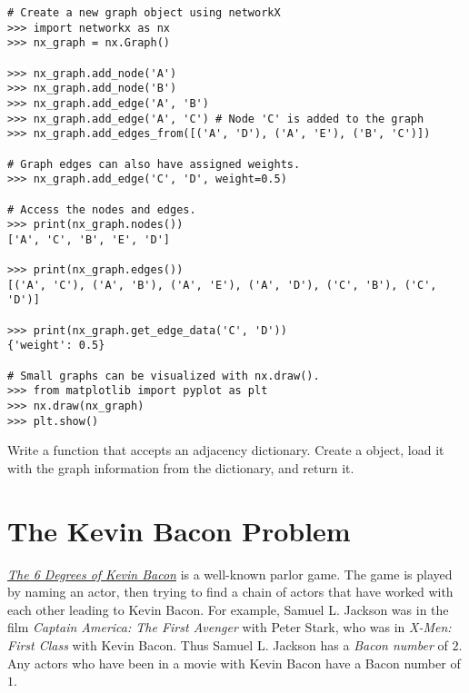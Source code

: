 \begin{lstlisting}
# Create a new graph object using networkX
>>> import networkx as nx
>>> nx_graph = nx.Graph()

>>> nx_graph.add_node('A')
>>> nx_graph.add_node('B')
>>> nx_graph.add_edge('A', 'B')
>>> nx_graph.add_edge('A', 'C') # Node 'C' is added to the graph
>>> nx_graph.add_edges_from([('A', 'D'), ('A', 'E'), ('B', 'C')])

# Graph edges can also have assigned weights.
>>> nx_graph.add_edge('C', 'D', weight=0.5)

# Access the nodes and edges.
>>> print(nx_graph.nodes())
['A', 'C', 'B', 'E', 'D']

>>> print(nx_graph.edges())
[('A', 'C'), ('A', 'B'), ('A', 'E'), ('A', 'D'), ('C', 'B'), ('C', 'D')]

>>> print(nx_graph.get_edge_data('C', 'D'))
{'weight': 0.5}

# Small graphs can be visualized with nx.draw().
>>> from matplotlib import pyplot as plt
>>> nx.draw(nx_graph)
>>> plt.show()
\end{lstlisting}

\begin{problem}
Write a function that accepts an adjacency dictionary.
Create a  object, load it with the graph information from the dictionary, and return it.
\end{problem}

\section*{The Kevin Bacon Problem}

\href{http://oracleofbacon.org/help.php}{\emph{The 6 Degrees of Kevin Bacon}} is a well-known parlor game.
The game is played by naming an actor, then trying to find a chain of actors that have worked with each other leading to Kevin Bacon.
For example, Samuel L. Jackson was in the film \emph{Captain America: The First Avenger} with Peter Stark, who was in \emph{X-Men: First Class} with Kevin Bacon.
Thus Samuel L. Jackson has a \emph{Bacon number} of $2$.
Any actors who have been in a movie with Kevin Bacon have a Bacon number of $1$.

